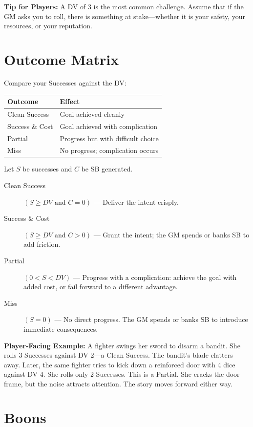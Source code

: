 \documentclass[11pt,twoside,openany]{book}
\begin{document}
\textbf{Tip for Players:} A DV of 3 is the most common challenge. Assume that if the GM asks you to roll, there is something at stake---whether it is your safety, your resources, or your reputation.

\section*{Outcome Matrix} 

Compare your Successes against the DV:

\begin{center}
\begin{tabular}{|l|l|}
\hline
\textbf{Outcome} & \textbf{Effect} \\
\hline
Clean Success & Goal achieved cleanly \\
Success \& Cost & Goal achieved with complication \\
Partial & Progress but with difficult choice \\
Miss & No progress; complication occurs \\
\hline
\end{tabular}
\end{center}

Let $S$ be successes and $C$ be SB generated.

\begin{description}
\item[Clean Success] $(S \geq DV \text{ and } C = 0)$ --- Deliver the intent crisply.
\item[Success \& Cost] $(S \geq DV \text{ and } C > 0)$ --- Grant the intent; the GM spends or banks SB to add friction.
\item[Partial] $(0 < S < DV)$ --- Progress with a complication: achieve the goal with added cost, or fail forward to a different advantage.
\item[Miss] $(S = 0)$ --- No direct progress. The GM spends or banks SB to introduce immediate consequences.
\end{description}

\textbf{Player-Facing Example:} A fighter swings her sword to disarm a bandit. She rolls 3 Successes against DV 2---a Clean Success. The bandit's blade clatters away. Later, the same fighter tries to kick down a reinforced door with 4 dice against DV 4. She rolls only 2 Successes. This is a Partial. She cracks the door frame, but the noise attracts attention. The story moves forward either way.

\section*{Boons} 
\end{document}
